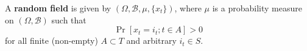 A \textbf{random field} is given by $(\Omega, \mathcal{B}, \mu, \{x_t\})$, where $\mu$ is a probability measure on $(\Omega, \mathcal{B})$ such that
$$\Pr[x_t = i_t; t \in A] > 0$$
for all finite (non-empty) $A \subset T$ and arbitrary $i_t \in S$.
